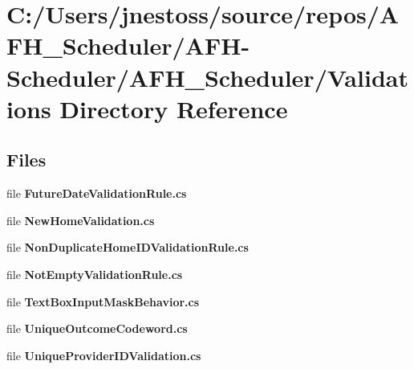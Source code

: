 \section{C\+:/\+Users/jnestoss/source/repos/\+A\+F\+H\+\_\+\+Scheduler/\+A\+F\+H-\/\+Scheduler/\+A\+F\+H\+\_\+\+Scheduler/\+Validations Directory Reference}
\label{dir_98828f58c7c1a205ba9a9dfbb1be3531}
\subsection*{Files}
\begin{DoxyCompactItemize}
\item 
file \textbf{ Future\+Date\+Validation\+Rule.\+cs}
\item 
file \textbf{ New\+Home\+Validation.\+cs}
\item 
file \textbf{ Non\+Duplicate\+Home\+I\+D\+Validation\+Rule.\+cs}
\item 
file \textbf{ Not\+Empty\+Validation\+Rule.\+cs}
\item 
file \textbf{ Text\+Box\+Input\+Mask\+Behavior.\+cs}
\item 
file \textbf{ Unique\+Outcome\+Codeword.\+cs}
\item 
file \textbf{ Unique\+Provider\+I\+D\+Validation.\+cs}
\end{DoxyCompactItemize}
